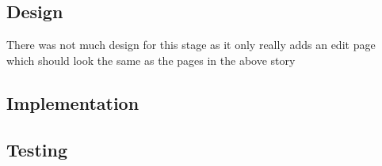 \documentclass{article}
\begin{document}
\subsection{Design}
There was not much design for this stage as it only really adds an edit page which should look the same as the pages in the above story
\subsection{Implementation}
\subsection{Testing}
\newpage


%
%
\end{document}
